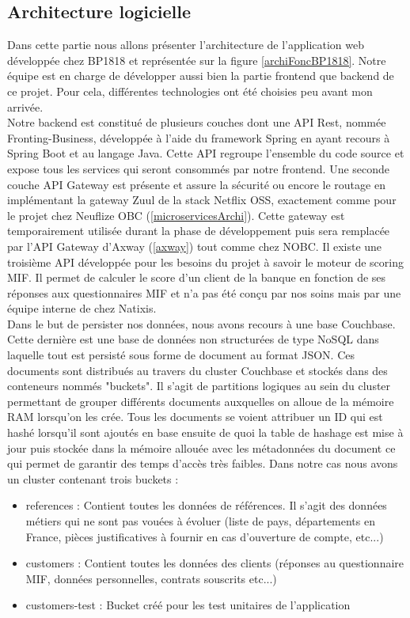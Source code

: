 \subsection{Architecture logicielle}
\label{archiBP1818}

	Dans cette partie nous allons présenter l'architecture de l'application web développée chez BP1818 et représentée sur la figure \ref{archiFoncBP1818}. Notre équipe est en charge de développer aussi bien la partie frontend que backend de ce projet. Pour cela, différentes technologies ont été choisies peu avant mon arrivée. \\
	
	Notre backend est constitué de plusieurs couches dont une API Rest, nommée Fronting-Business, développée à l'aide du framework Spring en ayant recours à Spring Boot et au langage Java. Cette API regroupe l'ensemble du code source et expose tous les services qui seront consommés par notre frontend. Une seconde couche API Gateway est présente et assure la sécurité ou encore le routage en implémentant la gateway Zuul de la stack Netflix OSS, exactement comme pour le projet chez Neuflize OBC (\ref{microservicesArchi}). Cette gateway est temporairement utilisée durant la phase de développement puis sera remplacée par l'API Gateway d'Axway (\ref{axway}) tout comme chez NOBC. Il existe une troisième API développée pour les besoins du projet à savoir le moteur de scoring MIF. Il permet de calculer le score d'un client de la banque en fonction de ses réponses aux questionnaires MIF et n'a pas été conçu par nos soins mais par une équipe interne de chez Natixis. \\
	
	Dans le but de persister nos données, nous avons recours à une base Couchbase. Cette dernière est une base de données non structurées de type NoSQL dans laquelle tout est persisté sous forme de document au format JSON. Ces documents sont distribués au travers du cluster Couchbase et stockés dans des conteneurs nommés "buckets". Il s'agit de partitions logiques au sein du cluster permettant de grouper différents documents auxquelles on alloue de la mémoire RAM lorsqu'on les crée. Tous les documents se voient attribuer un ID qui est hashé lorsqu'il sont ajoutés en base ensuite de quoi la table de hashage est mise à jour puis stockée dans la mémoire allouée avec les métadonnées du document ce qui permet de garantir des temps d'accès très faibles. Dans notre cas nous avons un cluster contenant trois buckets :
	\begin{itemize}
		\item references : Contient toutes les données de références. Il s'agit des données métiers qui ne sont pas vouées à évoluer (liste de pays, départements en France, pièces justificatives à fournir en cas d'ouverture de compte, etc...)
		\item customers : Contient toutes les données des clients (réponses au questionnaire MIF, données personnelles, contrats souscrits etc...)
		\item customers-test : Bucket créé pour les test unitaires de l'application \\
	\end{itemize}
	
